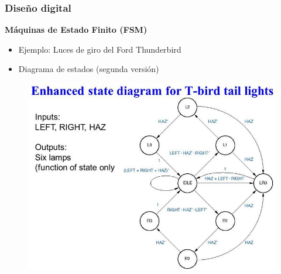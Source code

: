 \documentclass[aspectratio=169,compress]{beamer}
\begin{document}
\begin{footnotesize}
\begin{frame}[fragile]
\frametitle{Diseño digital}
\begin{center}\textbf{Máquinas de Estado Finito (FSM)}\end{center}
\begin{itemize}
\item Ejemplo: Luces de giro del Ford Thunderbird
\item Diagrama de estados (segunda versión)
\end{itemize}
\begin{figure}
\includegraphics[scale=0.25]{images/fsm5.jpg} 
\end{figure}
\end{frame}


\end{footnotesize}
\end{document}
